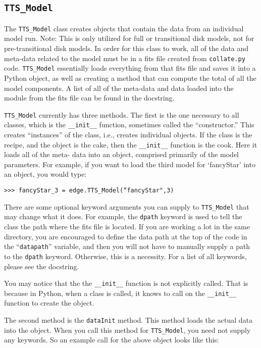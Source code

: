 \documentclass{article}
\begin{document}
 
\subsection {\texttt{TTS\_Model}}

The \texttt{TTS\_Model} class creates objects that contain the data from an individual model run. Note: This is only utilized for full or transitional disk models, not for pre-transitional disk models. In order for this class to work, all of the data and meta-data related to the model must be in a fits file created from \texttt{collate.py} code. \texttt{TTS\_Model} essentially loads everything from that fits file and saves it into a Python object, as well as creating a method that can compute the total of all the model components. A list of all of the meta-data and data loaded into the module from the fits file can be found in the docstring. 
 
\texttt{TTS\_Model} currently has three methods. The first is the one necessary to all classes, which is the \texttt{\_\_init\_\_} function, sometimes called the “constructor.” This creates “instances” of the class, i.e., creates individual objects. If the class is the recipe, and the object is the cake, then the \texttt{\_\_init\_\_} function is the cook. Here it loads all of the meta- data into an object, comprised primarily of the model parameters. For example, if you want to load the third model for `fancyStar' into an object, you would type: 
 
\vspace{2mm}
\texttt{>>> fancyStar\_3 = edge.TTS\_Model(``fancyStar",3)}
\vspace{2mm}

\noindent There are some optional keyword arguments you can supply to \texttt{TTS\_Model} that may change what it does. For example, the \texttt{dpath} keyword is used to tell the class the path where the fits file is located. If you are working a lot in the same directory, you are encouraged to define the data path at the top of the code in the “\texttt{datapath}” variable, and then you will not have to manually supply a path to the \texttt{dpath} keyword. Otherwise, this is a necessity. For a list of all keywords, please see the docstring. 
 
You may notice that the the \texttt{\_\_init\_\_} function is not explicitly called. That is because in Python, when a class is called, it knows to call on the \texttt{\_\_init\_\_} function to create the object. 
 
The second method is the \texttt{dataInit} method. This method loads the actual data into the object. When you call this method for \texttt{TTS\_Model}, you need not supply any keywords. So an example call for the above object looks like this: 
 
\end{document}
